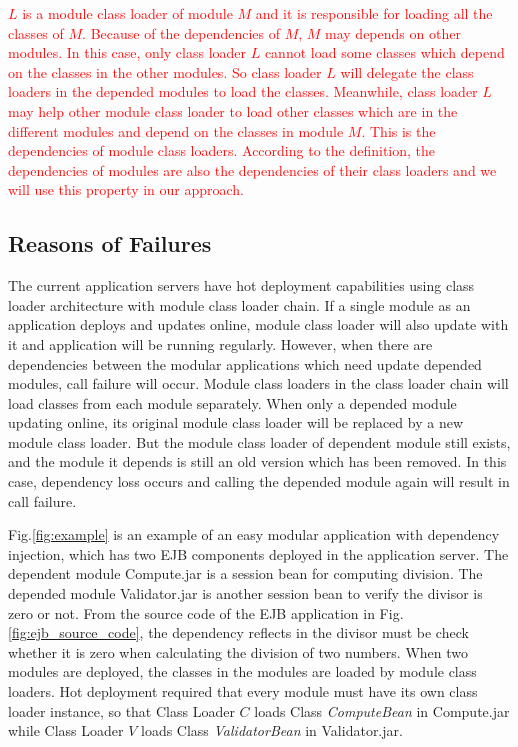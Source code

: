 \documentclass[conference]{IEEEtran}
\begin{document}
\textcolor{red}{$L$ is a module class loader of module $M$ and it is responsible for loading all the classes of $M$. 
Because of the dependencies of $M$, $M$ may depends on other modules. 
In this case, only class loader $L$ cannot load some classes which depend on the classes in the other modules. 
So class loader $L$ will delegate the class loaders in the depended modules to load the classes. 
Meanwhile, class loader $L$ may help other module class loader to load other classes which are in the different modules and depend on the classes in module $M$. 
This is the dependencies of module class loaders. 
According to the definition, the dependencies of modules are also the dependencies of their class loaders and we will use this property in our approach.}


\subsection{Reasons of Failures}

The current application servers have hot deployment capabilities using class loader architecture with module class loader chain.
If a single module as an application deploys and updates online, module class loader will also update with it and application will be running regularly.
However, when there are dependencies between the modular applications which need update depended modules, call failure will occur.
Module class loaders in the class loader chain will load classes from each module separately.
When only a depended module updating online, its original module class loader will be replaced by a new module class loader.
But the module class loader of dependent module still exists, and the module it depends is still an old version which has been removed.
In this case, dependency loss occurs and calling the depended module again will result in call failure.

Fig.\ref{fig:example} is an example of an easy modular application with dependency injection\cite{DI}, which has two EJB\cite{EJB} components deployed in the application server.
The dependent module Compute.jar is a session bean for computing division.
The depended module Validator.jar is another session bean to verify the divisor is zero or not. 
From the source code of the EJB application in Fig.\ref{fig:ejb_source_code}, the dependency reflects in the divisor must be check whether it is zero when calculating the division of two numbers. 
When two modules are deployed, the classes in the modules are loaded by module class loaders. 
Hot deployment required that every module must have its own class loader instance, so that Class Loader $C$ loads Class \emph{ComputeBean} in Compute.jar while Class Loader $V$ loads Class \emph{ValidatorBean} in Validator.jar.
\end{document}
